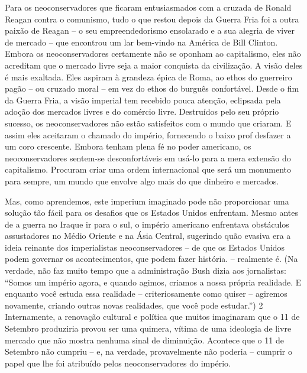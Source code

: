 Para os neoconservadores que ficaram entusiasmados com a cruzada de Ronald Reagan contra o comunismo, tudo o que restou depois da Guerra Fria foi a outra paixão de Reagan – o seu empreendedorismo ensolarado e a sua alegria de viver de mercado – que encontrou um lar bem-vindo na América de Bill Clinton. Embora os neoconservadores certamente não se oponham ao capitalismo, eles não acreditam que o mercado livre seja a maior conquista da civilização. A visão deles é mais exaltada. Eles aspiram à grandeza épica de Roma, ao ethos do guerreiro pagão – ou cruzado moral – em vez do ethos do burguês confortável. Desde o fim da Guerra Fria, a visão imperial tem recebido pouca atenção, eclipsada pela adoção dos mercados livres e do comércio livre. Destruídos pelo seu próprio sucesso, os neoconservadores não estão satisfeitos com o mundo que criaram. E assim eles aceitaram o chamado do império, fornecendo o baixo prof desfazer a um coro crescente. Embora tenham plena fé no poder americano, os neoconservadores sentem-se desconfortáveis ​​em usá-lo para a mera extensão do capitalismo. Procuram criar uma ordem internacional que será um monumento para sempre, um mundo que envolve algo mais do que dinheiro e mercados.
 \par 
Mas, como aprendemos, este imperium imaginado pode não proporcionar uma solução tão fácil para os desafios que os Estados Unidos enfrentam. Mesmo antes de a guerra no Iraque ir para o sul, o império americano enfrentava obstáculos assustadores no Médio Oriente e na Ásia Central, sugerindo quão evasiva era a ideia reinante dos imperialistas neoconservadores – de que os Estados Unidos podem governar os acontecimentos, que podem fazer história. – realmente é. (Na verdade, não faz muito tempo que a administração Bush dizia aos jornalistas: “Somos um império agora, e quando agimos, criamos a nossa própria realidade. E enquanto você estuda essa realidade – criteriosamente como quiser – agiremos novamente, criando outras novas realidades, que você pode estudar.”) {\color{blue}2} Internamente, a renovação cultural e política que muitos imaginaram que o {\color{blue}11} de Setembro produziria provou ser uma quimera, vítima de uma ideologia de livre mercado que não mostra nenhuma sinal de diminuição. Acontece que o {\color{blue}11} de Setembro não cumpriu – e, na verdade, provavelmente não poderia – cumprir o papel que lhe foi atribuído pelos neoconservadores do império.
 \par 

